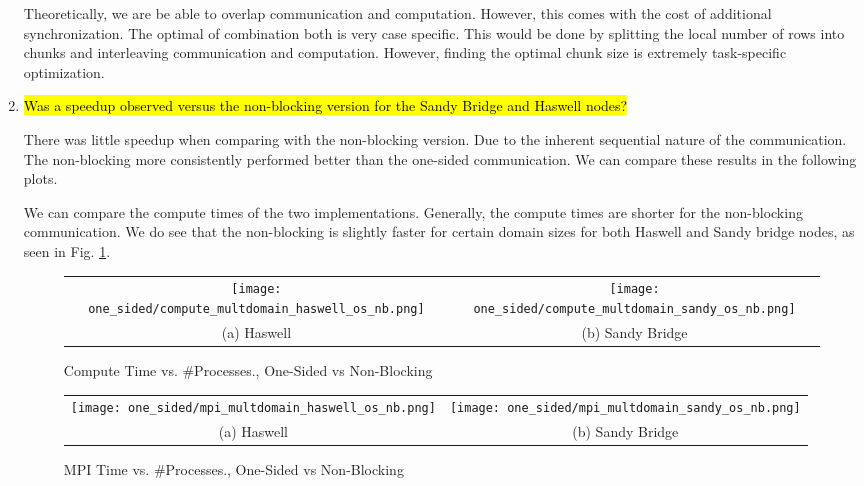 \begin{enumerate}
	Theoretically, we are be able to overlap communication and computation. However, this comes with the cost of additional synchronization. The optimal of combination both is very case specific. This would be done by splitting the local number of rows into chunks and interleaving communication and computation. However, finding the optimal chunk size is extremely task-specific optimization.

  \item \hl{Was a speedup observed versus the non-blocking version for the Sandy Bridge and Haswell nodes?}

	There was little speedup when comparing with the non-blocking version. Due to the inherent sequential nature of the communication. The non-blocking more consistently performed better than the one-sided communication. We can compare these results in the following plots.
	
	We can compare the compute times of the two implementations. Generally, the compute times are shorter for the non-blocking communication. 
	We do see that the non-blocking is slightly faster for certain domain sizes for both Haswell and Sandy bridge nodes, as seen in Fig. \ref{fig:compute_multdomain_os_nb}.
	    	\begin{figure}[h] %
		\hspace*{-0.25\linewidth}\begin{tabular}{cc}
			\texttt{[image: one\_sided/compute\_multdomain\_haswell\_os\_nb.png]} & \texttt{[image: one\_sided/compute\_multdomain\_sandy\_os\_nb.png]} \\
			(a) Haswell &  (b) Sandy Bridge\\[6pt]
		\end{tabular}
		\caption{Compute Time vs. \#Processes., One-Sided vs Non-Blocking}
		\label{fig:compute_multdomain_os_nb}
	\end{figure}
	
	
	\begin{figure}[h] %
		\hspace*{-0.25\linewidth}\begin{tabular}{cc}
			\texttt{[image: one\_sided/mpi\_multdomain\_haswell\_os\_nb.png]} & \texttt{[image: one\_sided/mpi\_multdomain\_sandy\_os\_nb.png]} \\
			(a) Haswell &  (b) Sandy Bridge\\[6pt]
		\end{tabular}
		\caption{MPI Time vs. \#Processes., One-Sided vs Non-Blocking}
		\label{fig:mpi_multdomain_os_nb}
	\end{figure}
	

\end{enumerate}
